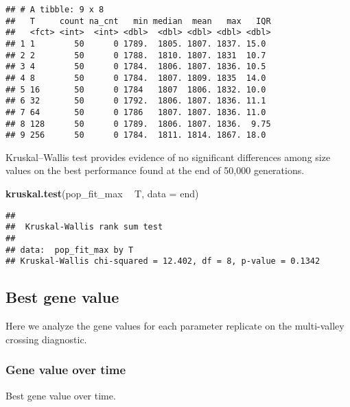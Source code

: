 \documentclass[]{book}
\newenvironment{Shaded}{\begin{snugshade}}{\end{snugshade}}
\newcommand{\DataTypeTok}[1]{\textcolor[rgb]{0.13,0.29,0.53}{#1}}
\newcommand{\KeywordTok}[1]{\textcolor[rgb]{0.13,0.29,0.53}{\textbf{#1}}}
\newcommand{\NormalTok}[1]{#1}
\newcommand{\OperatorTok}[1]{\textcolor[rgb]{0.81,0.36,0.00}{\textbf{#1}}}
\newcommand{\StringTok}[1]{\textcolor[rgb]{0.31,0.60,0.02}{#1}}
\begin{document}
\begin{verbatim}
## # A tibble: 9 x 8
##   T     count na_cnt   min median  mean   max   IQR
##   <fct> <int>  <int> <dbl>  <dbl> <dbl> <dbl> <dbl>
## 1 1        50      0 1789.  1805. 1807. 1837. 15.0 
## 2 2        50      0 1788.  1810. 1807. 1831  10.7 
## 3 4        50      0 1784.  1806. 1807. 1836. 10.5 
## 4 8        50      0 1784.  1807. 1809. 1835  14.0 
## 5 16       50      0 1784   1807  1806. 1832. 10.0 
## 6 32       50      0 1792.  1806. 1807. 1836. 11.1 
## 7 64       50      0 1786   1807. 1807. 1836. 11.0 
## 8 128      50      0 1789.  1806. 1807. 1836.  9.75
## 9 256      50      0 1784.  1811. 1814. 1867. 18.0
\end{verbatim}

Kruskal--Wallis test provides evidence of no significant differences among size values on the best performance found at the end of 50,000 generations.

\begin{Shaded}
\begin{Highlighting}[]
\KeywordTok{kruskal.test}\NormalTok{(pop_fit_max }\OperatorTok{~}\StringTok{ }\NormalTok{T, }\DataTypeTok{data =}\NormalTok{ end)}
\end{Highlighting}
\end{Shaded}

\begin{verbatim}
## 
##  Kruskal-Wallis rank sum test
## 
## data:  pop_fit_max by T
## Kruskal-Wallis chi-squared = 12.402, df = 8, p-value = 0.1342
\end{verbatim}

\hypertarget{best-gene-value-1}{%
\subsection{Best gene value}\label{best-gene-value-1}}

Here we analyze the gene values for each parameter replicate on the multi-valley crossing diagnostic.

\hypertarget{gene-value-over-time}{%
\subsubsection{Gene value over time}\label{gene-value-over-time}}

Best gene value over time.

\begin{Shaded}
\end{Shaded}
\end{document}
